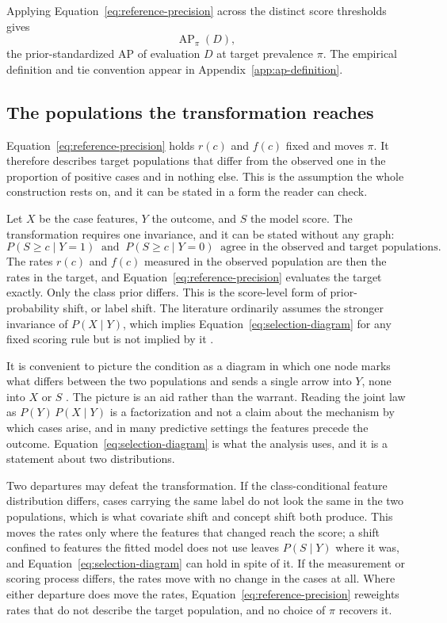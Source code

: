\documentclass[11pt]{article}
\newcommand{\AP}{\operatorname{AP}}
\theoremstyle{remark}
\begin{document}
Applying Equation~\eqref{eq:reference-precision} across the distinct score thresholds gives
\[
\AP_\pi(D),
\]
the prior-standardized AP of evaluation $D$ at target prevalence $\pi$. The empirical definition and tie convention appear in Appendix~\ref{app:ap-definition}.

\subsection{The populations the transformation reaches}
\label{sec:transport}

Equation~\eqref{eq:reference-precision} holds $r(c)$ and $f(c)$ fixed and moves $\pi$. It therefore describes target populations that differ from the observed one in the proportion of positive cases and in nothing else. This is the assumption the whole construction rests on, and it can be stated in a form the reader can check.

Let $X$ be the case features, $Y$ the outcome, and $S$ the model score. The transformation requires one invariance, and it can be stated without any graph:
\begin{equation}
P(S\geq c\mid Y=1)
\ \text{ and }\
P(S\geq c\mid Y=0)
\ \text{ agree in the observed and target populations.}
\label{eq:selection-diagram}
\end{equation}
The rates $r(c)$ and $f(c)$ measured in the observed population are then the rates in the target, and Equation~\eqref{eq:reference-precision} evaluates the target exactly. Only the class prior differs. This is the score-level form of prior-probability shift, or label shift. The literature ordinarily assumes the stronger invariance of $P(X\mid Y)$, which implies Equation~\eqref{eq:selection-diagram} for any fixed scoring rule but is not implied by it \cite{saerens2002adjusting,storkey2009training,lipton2018detecting}.

It is convenient to picture the condition as a diagram in which one node marks what differs between the two populations and sends a single arrow into $Y$, none into $X$ or $S$ \cite{pearl2011transportability,bareinboim2013transportability}. The picture is an aid rather than the warrant. Reading the joint law as $P(Y)\,P(X\mid Y)$ is a factorization and not a claim about the mechanism by which cases arise, and in many predictive settings the features precede the outcome. Equation~\eqref{eq:selection-diagram} is what the analysis uses, and it is a statement about two distributions.

Two departures may defeat the transformation. If the class-conditional feature distribution differs, cases carrying the same label do not look the same in the two populations, which is what covariate shift and concept shift both produce. This moves the rates only where the features that changed reach the score; a shift confined to features the fitted model does not use leaves $P(S\mid Y)$ where it was, and Equation~\eqref{eq:selection-diagram} can hold in spite of it. If the measurement or scoring process differs, the rates move with no change in the cases at all. Where either departure does move the rates, Equation~\eqref{eq:reference-precision} reweights rates that do not describe the target population, and no choice of $\pi$ recovers it.
\end{document}
